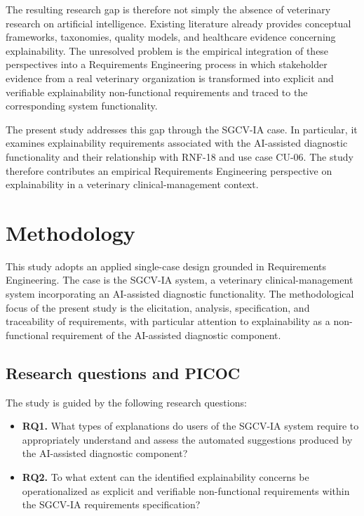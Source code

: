 \documentclass[pdflatex,sn-mathphys-num,Numbered]{sn-jnl}
\begin{document}
The resulting research gap is therefore not simply the absence of veterinary research on artificial intelligence. Existing literature already provides conceptual frameworks, taxonomies, quality models, and healthcare evidence concerning explainability. The unresolved problem is the empirical integration of these perspectives into a Requirements Engineering process in which stakeholder evidence from a real veterinary organization is transformed into explicit and verifiable explainability non-functional requirements and traced to the corresponding system functionality.

The present study addresses this gap through the SGCV-IA case. In particular, it examines explainability requirements associated with the AI-assisted diagnostic functionality and their relationship with RNF-18 and use case CU-06. The study therefore contributes an empirical Requirements Engineering perspective on explainability in a veterinary clinical-management context.

\section{Methodology}\label{sec3}

This study adopts an applied single-case design grounded in Requirements Engineering. The case is the SGCV-IA system, a veterinary clinical-management system incorporating an AI-assisted diagnostic functionality. The methodological focus of the present study is the elicitation, analysis, specification, and traceability of requirements, with particular attention to explainability as a non-functional requirement of the AI-assisted diagnostic component.

\subsection{Research questions and PICOC}\label{subsec1}

The study is guided by the following research questions:

\begin{itemize}
\item \textbf{RQ1.} What types of explanations do users of the SGCV-IA system require to appropriately understand and assess the automated suggestions produced by the AI-assisted diagnostic component?
\item \textbf{RQ2.} To what extent can the identified explainability concerns be operationalized as explicit and verifiable non-functional requirements within the SGCV-IA requirements specification?
\end{itemize}
\end{document}
